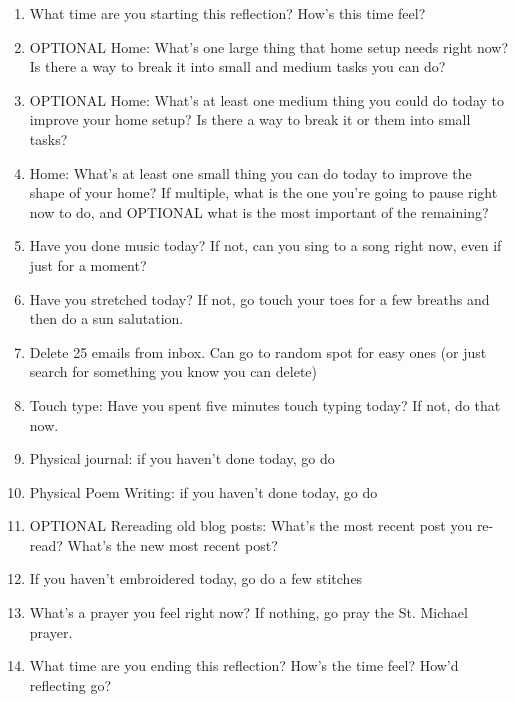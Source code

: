 
\begin{enumerate}

\item What time are you starting this reflection? How's this time feel?

\item OPTIONAL Home: What's one large thing that home setup needs right now? Is there a way to break it into small and medium tasks you can do?

\item OPTIONAL Home: What's at least one medium thing you could do today to improve
your home setup? Is there a way to break it or them into small tasks?

\item Home: What's at least one small thing you can do today to improve the
shape of your home? If multiple, what is the one you're going to pause
right now to do, and OPTIONAL what is the most important of the remaining?

\item Have you done music today? If not, can you sing to a song right now, even if just for a  moment?

\item Have you stretched today? If not, go touch your toes for a few breaths and then do a sun salutation.

\item Delete 25 emails from inbox. Can go to random spot for easy ones (or just search for something you know you can delete)

\item Touch type: Have you spent five minutes touch typing today? If not, do that now.

\item Physical journal: if you haven't done today, go do

\item Physical Poem Writing: if you haven't done today, go do

\item OPTIONAL Rereading old blog posts: What's the most recent post you re-read? What's the new most recent post?

\item If you haven't embroidered today, go do a few stitches

\item What's a prayer you feel right now? If nothing, go pray the St. Michael prayer.

\item What time are you ending this reflection? How's the time feel? How'd reflecting go?

\end{enumerate}

